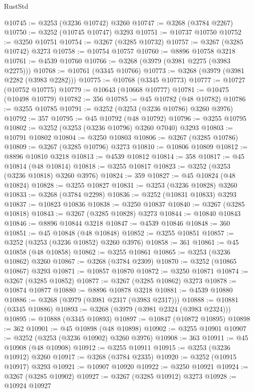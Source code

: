 \begin{lexlean}{RustStd}
\begin{coremodule}
@10745 := @3253 (@3236 @10742) @3260
@10747 := @3268 (@3784 @2267)
@10750 := @3252 (@10745 @10747) @3293
@10751 := @10737 @10750
@10752 := @3250 @10751
@10754 := @3267 (@3285 @10732)
@10757 := @3267 (@3285 @10742) @3273
@10758 := @10754 @10757
@10760 := @8896 @10758 @3218
@10761 := @4539 @10760
@10766 := @3268 (@3979 (@3981 @2275 (@3983 @2275)))
@10768 := @10761 (@3345 @10766)
@10773 := @3268 (@3979 (@3981 @2282 (@3983 @2282)))
@10775 := @10768 (@3345 @10773)
@10777 := @10727 (@10752 @10775)
@10779 := @10643 (@10668 @10777)
@10781 := @10475 (@10498 @10779)
@10782 := 356
@10785 := @45 @10782 (@48 @10782)
@10786 := @3255 @10785
@10791 := @3252 (@3253 (@3236 @10786) @3260 @3976)
@10792 := 357
@10795 := @45 @10792 (@48 @10792)
@10796 := @3255 @10795
@10802 := @3252 (@3253 (@3236 @10796) @3260 @7040) @3293
@10803 := @10791 @10802
@10804 := @3250 @10803
@10806 := @3267 (@3285 @10786)
@10809 := @3267 (@3285 @10796) @3273
@10810 := @10806 @10809
@10812 := @8896 @10810 @3218
@10813 := @4539 @10812
@10814 := 358
@10817 := @45 @10814 (@48 @10814)
@10818 := @3255 @10817
@10823 := @3252 (@3253 (@3236 @10818) @3260 @3976)
@10824 := 359
@10827 := @45 @10824 (@48 @10824)
@10828 := @3255 @10827
@10831 := @3253 (@3236 @10828) @3260
@10833 := @3268 (@3784 @2298)
@10836 := @3252 (@10831 @10833) @3293
@10837 := @10823 @10836
@10838 := @3250 @10837
@10840 := @3267 (@3285 @10818)
@10843 := @3267 (@3285 @10828) @3273
@10844 := @10840 @10843
@10846 := @8896 @10844 @3218
@10847 := @4539 @10846
@10848 := 360
@10851 := @45 @10848 (@48 @10848)
@10852 := @3255 @10851
@10857 := @3252 (@3253 (@3236 @10852) @3260 @3976)
@10858 := 361
@10861 := @45 @10858 (@48 @10858)
@10862 := @3255 @10861
@10865 := @3253 (@3236 @10862) @3260
@10867 := @3268 (@3784 @2309)
@10870 := @3252 (@10865 @10867) @3293
@10871 := @10857 @10870
@10872 := @3250 @10871
@10874 := @3267 (@3285 @10852)
@10877 := @3267 (@3285 @10862) @3273
@10878 := @10874 @10877
@10880 := @8896 @10878 @3218
@10881 := @4539 @10880
@10886 := @3268 (@3979 (@3981 @2317 (@3983 @2317)))
@10888 := @10881 (@3345 @10886)
@10893 := @3268 (@3979 (@3981 @2324 (@3983 @2324)))
@10895 := @10888 (@3345 @10893)
@10897 := @10847 (@10872 @10895)
@10898 := 362
@10901 := @45 @10898 (@48 @10898)
@10902 := @3255 @10901
@10907 := @3252 (@3253 (@3236 @10902) @3260 @3976)
@10908 := 363
@10911 := @45 @10908 (@48 @10908)
@10912 := @3255 @10911
@10915 := @3253 (@3236 @10912) @3260
@10917 := @3268 (@3784 @2335)
@10920 := @3252 (@10915 @10917) @3293
@10921 := @10907 @10920
@10922 := @3250 @10921
@10924 := @3267 (@3285 @10902)
@10927 := @3267 (@3285 @10912) @3273
@10928 := @10924 @10927

\end{coremodule}
\end{lexlean}
